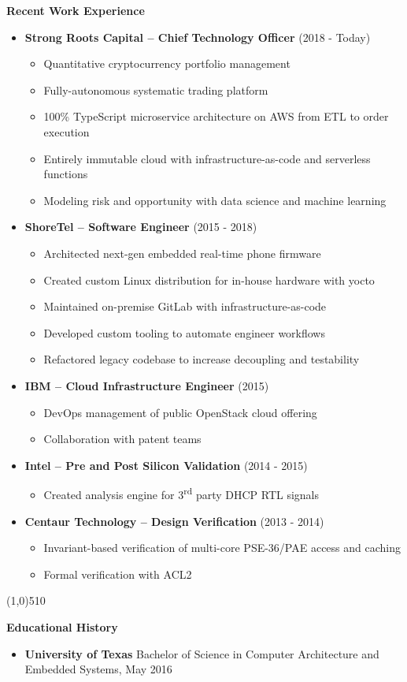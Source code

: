 \documentclass{report}
\newcommand{\cut}{\begin{center} \line(1,0){510} \end{center}}
\begin{document}
\textbf{Recent Work Experience}
\begin{itemize}[label=$\cdot$]

\item \textbf{Strong Roots Capital -- Chief Technology Officer} (2018 - Today)
  \begin{itemize}[label=$\circ$]
  \item Quantitative cryptocurrency portfolio management
  \item Fully-autonomous systematic trading platform
  \item 100\% TypeScript microservice architecture on AWS from ETL to order execution
  \item Entirely immutable cloud with infrastructure-as-code and serverless functions
  \item Modeling risk and opportunity with data science and machine learning
  \end{itemize}

\item \textbf{ShoreTel -- Software Engineer} (2015 - 2018)
  \begin{itemize}[label=$\circ$]
  \item Architected next-gen embedded real-time phone firmware
  \item Created custom Linux distribution for in-house hardware with yocto
  \item Maintained on-premise GitLab with infrastructure-as-code
  \item Developed custom tooling to automate engineer workflows
  \item Refactored legacy codebase to increase decoupling and testability
  \end{itemize}

\item \textbf{IBM -- Cloud Infrastructure Engineer} (2015)
  \begin{itemize}[label=$\circ$]
  \item DevOps management of public OpenStack cloud offering
  \item Collaboration with patent teams
  \end{itemize}

\item \textbf{Intel -- Pre and Post Silicon Validation} (2014 - 2015)
  \begin{itemize}[label=$\circ$]
  \item Created analysis engine for 3\textsuperscript{rd} party DHCP RTL signals
  \end{itemize}

\item \textbf{Centaur Technology -- Design Verification} (2013 - 2014)
  \begin{itemize}[label=$\circ$]
  \item Invariant-based verification of multi-core PSE-36/PAE access and caching
  \item Formal verification with ACL2
  \end{itemize}

\end{itemize}

\cut{}

\textbf{Educational History}
\begin{itemize}[label=$\cdot$]
\item \textbf{University of Texas} Bachelor of Science in Computer Architecture and Embedded Systems, May 2016
\end{itemize}
\end{document}
